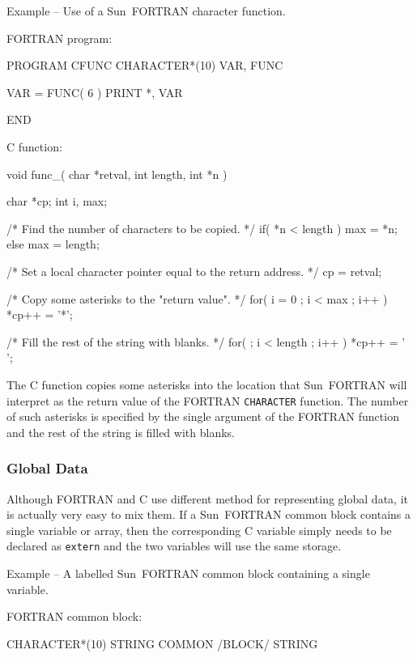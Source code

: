 \documentclass[twoside,11pt,nolof]{starlink}
\newcounter{examples}
\begin{document}
\label{sun_charfn}
\begin{center}
Example\latex{~\ref{sun_charfn}}
-- Use of a Sun~FORTRAN character function.
\end{center}
\nopagebreak[4]
FORTRAN program:
\nopagebreak[4]
\begin{small}
\begin{terminalv}
      PROGRAM CFUNC
      CHARACTER*(10) VAR, FUNC

      VAR = FUNC( 6 )
      PRINT *, VAR

      END
\end{terminalv}
\end{small}
\pagebreak[1]
C function:
\nopagebreak[4]
\begin{small}
\begin{terminalv}
void func_( char *retval, int length, int *n )
{
  char *cp;
  int i, max;

/* Find the number of characters to be copied.  */
  if( *n < length )
     max = *n;
  else
     max = length;

/* Set a local character pointer equal to the return address.  */
  cp = retval;

/* Copy some asterisks to the "return value".  */
  for( i = 0 ; i < max ; i++ )
     *cp++ = '*';

/* Fill the rest of the string with blanks.  */
  for( ; i < length ; i++ )
     *cp++ = ' ';
}
\end{terminalv}
\end{small}

The C function copies some asterisks into the location that Sun~FORTRAN will
interpret as the return value of the FORTRAN \texttt{CHARACTER} function.
The number of
such asterisks is specified by the single argument of the FORTRAN function and
the rest of the string is filled with blanks.

\subsubsection{Global Data}

Although FORTRAN and C use different method for representing global data, it is
actually very easy to mix them. If a Sun~FORTRAN common block contains a single
variable or array, then the corresponding C variable simply needs to be
declared as \texttt{extern} and the two variables will use the same storage.

\label{sun_common}
\begin{center}
Example\latex{~\ref{sun_common}}
-- A labelled Sun~FORTRAN common block containing a
single variable.
\end{center}
\nopagebreak[4]
FORTRAN common block:
\begin{small}
\begin{terminalv}
      CHARACTER*(10) STRING
      COMMON /BLOCK/ STRING
\end{terminalv}
\end{small}
\end{document}
